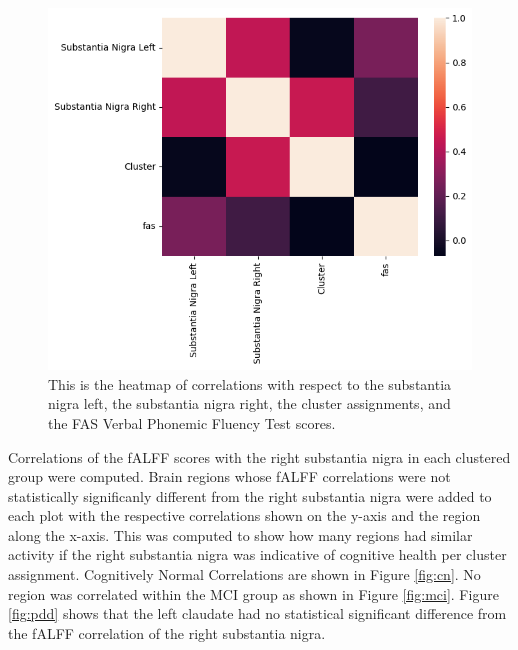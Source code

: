 \documentclass[12pt]{article}
\begin{document}
\begin{figure}[h]  %
    \centering
    \includegraphics[width=\textwidth]{"../img/fALFF_SN_fas_test_correlation_heatmap.png"}  %
    \caption{This is the heatmap of correlations with respect to the substantia nigra left, the substantia nigra right, the cluster assignments, and the FAS Verbal Phonemic Fluency Test scores.}
    \label{fig:heatmap}  %
\end{figure}

\FloatBarrier

Correlations of the fALFF scores with the right substantia nigra in each clustered group were computed. Brain regions whose fALFF correlations were not statistically significanly different from the right substantia nigra were added to each plot with the respective correlations shown on the y-axis and the region along the x-axis. This was computed to show how many regions had similar activity if the right substantia nigra was indicative of cognitive health per cluster assignment. Cognitively Normal Correlations are shown in Figure \ref{fig:cn}. No region was correlated within the MCI group as shown in Figure \ref{fig:mci}. Figure \ref{fig:pdd} shows that the left claudate had no statistical significant difference from the fALFF correlation of the right substantia nigra.
\end{document}
